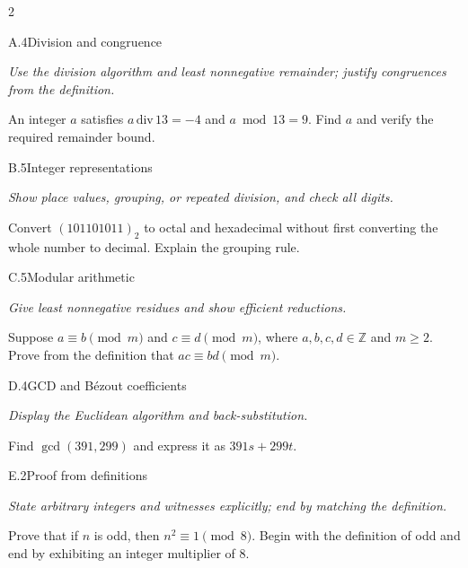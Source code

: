 \documentclass[9pt]{extarticle}
\begin{document}
\begin{multicols}{2}
\begin{CoreProblem}{A.4}{Division and congruence}
{\scriptsize\textit{Use the division algorithm and least nonnegative remainder; justify congruences from the definition.}\par}
An integer $a$ satisfies $a\,\mathrm{div}\,13=-4$ and $a\bmod13=9$.
Find $a$ and verify the required remainder bound.
\end{CoreProblem}
\begin{CoreProblem}{B.5}{Integer representations}
{\scriptsize\textit{Show place values, grouping, or repeated division, and check all digits.}\par}
Convert $(101101011)_2$ to octal and hexadecimal without first converting the
whole number to decimal. Explain the grouping rule.
\end{CoreProblem}
\begin{CoreProblem}{C.5}{Modular arithmetic}
{\scriptsize\textit{Give least nonnegative residues and show efficient reductions.}\par}
Suppose $a\equiv b\pmod m$ and $c\equiv d\pmod m$, where
$a,b,c,d\in\mathbb Z$ and $m\ge2$. Prove from the definition that
$ac\equiv bd\pmod m$.
\end{CoreProblem}
\columnbreak
\begin{CoreProblem}{D.4}{GCD and B\'ezout coefficients}
{\scriptsize\textit{Display the Euclidean algorithm and back-substitution.}\par}
Find $\gcd(391,299)$ and express it as $391s+299t$.
\end{CoreProblem}
\begin{CoreProblem}{E.2}{Proof from definitions}
{\scriptsize\textit{State arbitrary integers and witnesses explicitly; end by matching the definition.}\par}
Prove that if $n$ is odd, then $n^2\equiv1\pmod{8}$. Begin with the definition
of odd and end by exhibiting an integer multiplier of $8$.
\end{CoreProblem}
\end{multicols}
\CoreWorkArea
\FormBreak
{}
\end{document}
